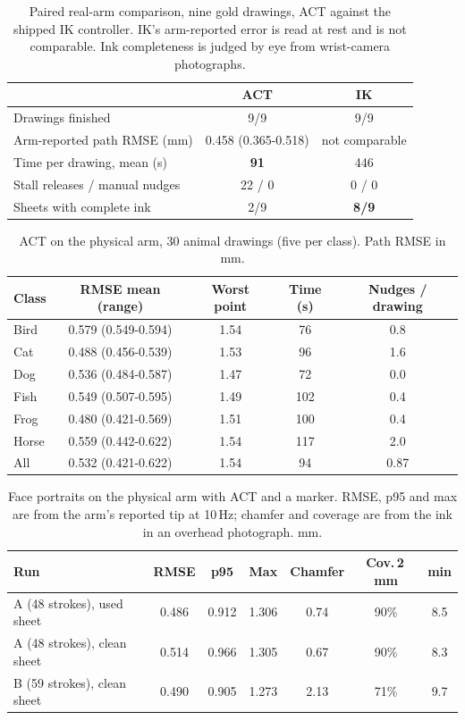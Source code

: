 \documentclass[conference]{IEEEtran}
\begin{document}
\begin{table}[t]
\centering
\caption{Paired real-arm comparison, nine gold drawings, ACT against the shipped IK controller. IK's
arm-reported error is read at rest and is not comparable. Ink completeness is judged by eye from wrist-camera
photographs.}
\label{tab:paired}
\setlength{\tabcolsep}{5pt}
\begin{tabular}{lcc}
\toprule
 & ACT & IK \\
\midrule
Drawings finished & 9/9 & 9/9 \\
Arm-reported path RMSE (mm) & 0.458 (0.365-0.518) & not comparable \\
Time per drawing, mean (s) & \textbf{91} & 446 \\
Stall releases / manual nudges & 22 / 0 & 0 / 0 \\
Sheets with complete ink & 2/9 & \textbf{8/9} \\
\bottomrule
\end{tabular}
\end{table}

\begin{table}[t]
\centering
\caption{ACT on the physical arm, 30 animal drawings (five per class). Path RMSE in mm.}
\label{tab:realclass}
\setlength{\tabcolsep}{3pt}
\begin{tabular}{lcccc}
\toprule
Class & RMSE mean (range) & Worst point & Time (s) & Nudges / drawing \\
\midrule
Bird  & 0.579 (0.549-0.594) & 1.54 & 76  & 0.8 \\
Cat   & 0.488 (0.456-0.539) & 1.53 & 96  & 1.6 \\
Dog   & 0.536 (0.484-0.587) & 1.47 & 72  & 0.0 \\
Fish  & 0.549 (0.507-0.595) & 1.49 & 102 & 0.4 \\
Frog  & 0.480 (0.421-0.569) & 1.51 & 100 & 0.4 \\
Horse & 0.559 (0.442-0.622) & 1.54 & 117 & 2.0 \\
\midrule
All   & 0.532 (0.421-0.622) & 1.54 & 94  & 0.87 \\
\bottomrule
\end{tabular}
\end{table}

\begin{table}[t]
\centering
\caption{Face portraits on the physical arm with ACT and a marker. RMSE, p95 and max are from the arm's reported
tip at 10\,Hz; chamfer and coverage are from the ink in an overhead photograph. mm.}
\label{tab:real}
\setlength{\tabcolsep}{2.2pt}
\begin{tabular}{lcccccc}
\toprule
Run & RMSE & p95 & Max & Chamfer & Cov.\,2\,mm & min \\
\midrule
A (48 strokes), used sheet  & 0.486 & 0.912 & 1.306 & 0.74 & 90\% & 8.5 \\
A (48 strokes), clean sheet & 0.514 & 0.966 & 1.305 & 0.67 & 90\% & 8.3 \\
B (59 strokes), clean sheet & 0.490 & 0.905 & 1.273 & 2.13 & 71\% & 9.7 \\
\bottomrule
\end{tabular}
\end{table}
\end{document}
